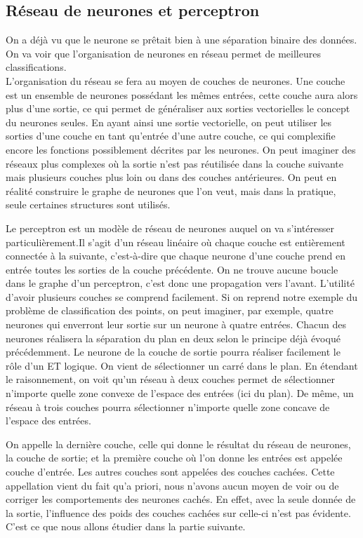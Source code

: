 \subsection{Réseau de neurones et perceptron} %
\label{sub:reseau_de_neurones}
On a déjà vu que le neurone se prêtait bien à une séparation binaire des données. On va voir que l’organisation de neurones en réseau permet de meilleures classifications.\\
L’organisation du réseau se fera au moyen de couches de neurones. Une couche est un ensemble de neurones possédant les mêmes entrées, cette couche aura alors plus d'une sortie, ce qui permet de généraliser aux sorties vectorielles le concept du neurones seules. En ayant ainsi une sortie vectorielle, on peut utiliser les sorties d'une couche en tant qu'entrée d'une autre couche, ce qui complexifie encore les fonctions possiblement décrites par les neurones.
On peut imaginer des réseaux plus complexes où la sortie n'est pas réutilisée dans la couche suivante mais plusieurs couches plus loin ou dans des couches antérieures. On peut en réalité construire le graphe de neurones que l'on veut, mais dans la pratique, seule certaines structures sont utilisés. 


Le perceptron est un modèle de réseau de neurones auquel on va s’intéresser particulièrement.Il s'agit d'un réseau linéaire où chaque couche est entièrement connectée à la suivante, c'est-à-dire que chaque neurone d'une couche prend en entrée toutes les sorties de la couche précédente. On ne trouve aucune boucle dans le graphe d'un perceptron, c'est donc une propagation vers l'avant.
L’utilité d’avoir plusieurs couches se comprend facilement. Si on reprend notre exemple du problème de classification des points, on peut imaginer, par exemple, quatre neurones qui enverront leur sortie sur un neurone à quatre entrées. Chacun des neurones réalisera la séparation du plan en deux selon le principe déjà évoqué précédemment. Le neurone de la couche de sortie pourra réaliser facilement le rôle d’un ET logique. On vient de sélectionner un carré dans le plan. En étendant le raisonnement, on voit qu’un réseau à deux couches permet de sélectionner n’importe quelle zone convexe de l’espace des entrées (ici du plan). De même, un réseau à trois couches pourra sélectionner n’importe quelle zone concave de l’espace des entrées.

On appelle la dernière couche, celle qui donne le résultat du réseau de neurones, la couche de sortie; et la première couche où l'on donne les entrées est appelée couche d'entrée. Les autres couches sont appelées des couches cachées. Cette appellation vient du fait qu’a priori, nous n’avons aucun moyen de voir ou de corriger les comportements des neurones cachés. En effet, avec la seule donnée de la sortie, l’influence des poids des couches cachées sur celle-ci n'est pas évidente. C'est ce que nous allons étudier dans la partie suivante. 




